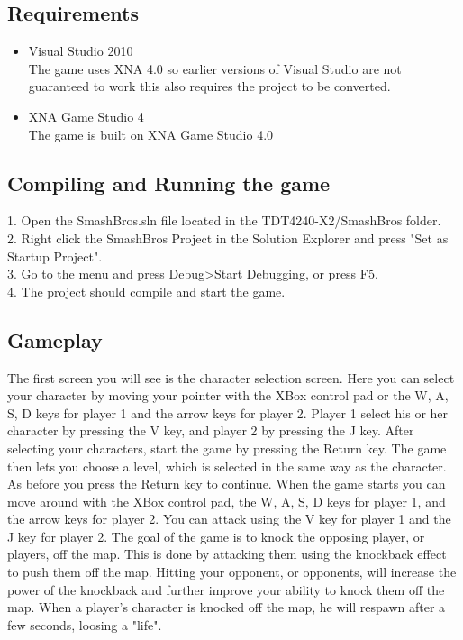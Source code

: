 \subsection{Requirements}
\begin{itemize}
\item Visual Studio 2010 \cite{bib:visualstudio}\\
The game uses XNA 4.0 so earlier versions of Visual Studio are not guaranteed to work this also requires the project to be converted.

\item XNA Game Studio 4 \cite{bib:xna}\\
The game is built on XNA Game Studio 4.0
\end{itemize}

\subsection{Compiling and Running the game}
1. Open the SmashBros.sln file located in the TDT4240-X2/SmashBros folder.\\
2. Right click the SmashBros Project in the Solution Explorer and press "Set as Startup Project".\\
3. Go to the menu and press Debug>Start Debugging, or press F5.\\
4. The project should compile and start the game.

\subsection{Gameplay}
The first screen you will see is the character selection screen. Here you can select your character by moving your pointer with the XBox control pad or the W, A, S, D keys for player 1 and the arrow keys for player 2. Player 1 select his or her character by pressing the V key, and player 2 by pressing the J key. After selecting your characters, start the game by pressing the Return key. The game then lets you choose a level, which is selected in the same way as the character. As before you press the Return key to continue. When the game starts you can move around with the XBox control pad, the W, A, S, D keys for player 1, and the arrow keys for player 2. You can attack using the V key for player 1 and the J key for player 2. The goal of the game is to knock the opposing player, or players, off the map. This is done by attacking them using the knockback effect to push them off the map. Hitting your opponent, or opponents, will increase the power of the knockback and further improve your ability to knock them off the map. When a player's character is knocked off the map, he will respawn after a few seconds, loosing a "life".
